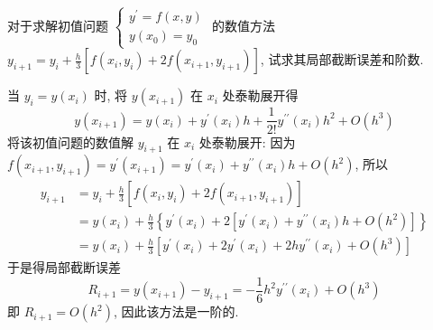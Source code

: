 \begin{tcolorbox}[enhanced,colback=8,colframe=7,breakable,coltitle=green!25!black,title=2024]
对于求解初值问题
$
\left\{\begin{array}{l}
y^{\prime}=f(x, y) \\
y\left(x_{0}\right)=y_{0}
\end{array}\right.
$
的数值方法 $ y_{i+1}=y_{i}+\frac{h}{3}\left[f\left(x_{i}, y_{i}\right)+2 f\left(x_{i+1}, y_{i+1}\right)\right] $, 试求其局部截断误差和阶数.

\tcblower
 当 $ y_{i}=y\left(x_{i}\right) $ 时, 将 $ y\left(x_{i+1}\right) $ 在 $ x_{i} $ 处泰勒展开得
$$
y\left(x_{i+1}\right)=y\left(x_{i}\right)+y^{\prime}\left(x_{i}\right) h+\frac{1}{2!} y^{\prime \prime}\left(x_{i}\right) h^{2}+O\left(h^{3}\right)
$$
将该初值问题的数值解 $ y_{i+1} $ 在 $ x_{i} $ 处泰勒展开:
因为 $ f\left(x_{i+1}, y_{i+1}\right)=y^{\prime}\left(x_{i+1}\right)=y^{\prime}\left(x_{i}\right)+y^{\prime \prime}\left(x_{i}\right) h+O\left(h^{2}\right) $, 所以
$$
\begin{aligned}
y_{i+1} & =y_{i}+\frac{h}{3}\left[f\left(x_{i}, y_{i}\right)+2 f\left(x_{i+1}, y_{i+1}\right)\right] \\
& =y\left(x_{i}\right)+\frac{h}{3}\left\{y^{\prime}\left(x_{i}\right)+2\left[y^{\prime}\left(x_{i}\right)+y^{\prime \prime}\left(x_{i}\right) h+O\left(h^{2}\right)\right]\right\}\\
&=y\left(x_{i}\right)+\frac{h}{3}\left[y^{\prime}\left(x_{i}\right)+2 y^{\prime}\left(x_{i}\right)+2 h y^{\prime \prime}\left(x_{i}\right)+O\left(h^{3}\right)\right]
\end{aligned}
$$
于是得局部截断误差
$$
R_{i+1}  =y\left(x_{i+1}\right)-y_{i+1}  =-\frac{1}{6} h^{2} y^{\prime \prime}\left(x_{i}\right)+O\left(h^{3}\right)
$$
即 $ R_{i+1}=O\left(h^{2}\right) $, 因此该方法是一阶的.
\end{tcolorbox}


